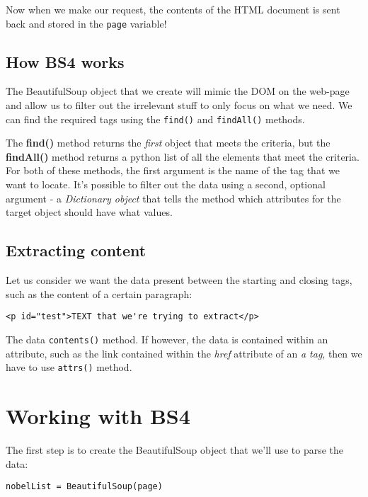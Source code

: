 \noindent
Now when we make our request, the contents of the HTML document is sent back and stored in the \verb|page| variable!

\subsection{How BS4 works}
The BeautifulSoup object that we create will mimic the DOM on the web-page and allow us to filter out the irrelevant stuff to only focus on what we need. We can find the required tags using the \verb|find()| and \verb|findAll()| methods. 

The \textbf{find()} method returns the \textit{first} object that meets the criteria, but the \textbf{findAll()} method returns a python list of all the elements that meet the criteria. For both of these methods, the first argument is the name of the tag that we want to locate. It's possible to filter out the data using a second, optional argument - a \textit{Dictionary object} that tells the method which attributes for the target object should have what values. 

\subsection{Extracting content}
Let us consider we want the data present between the starting and closing tags, such as the content of a certain paragraph:

\vspace{-15pt}
\begin{verbatim}
<p id="test">TEXT that we're trying to extract</p>
\end{verbatim}
\vspace{-10pt}	

\noindent
The data \verb|contents()| method. If however, the data is contained within an attribute, such as the link contained within the \textit{href} attribute of an \textit{a tag}, then we have to use \verb|attrs()| method. 

\section{Working with BS4}
The first step is to create the BeautifulSoup object that we'll use to parse the data:

\vspace{-15pt}
\begin{verbatim}
nobelList = BeautifulSoup(page)
\end{verbatim}
\vspace{-10pt}	

